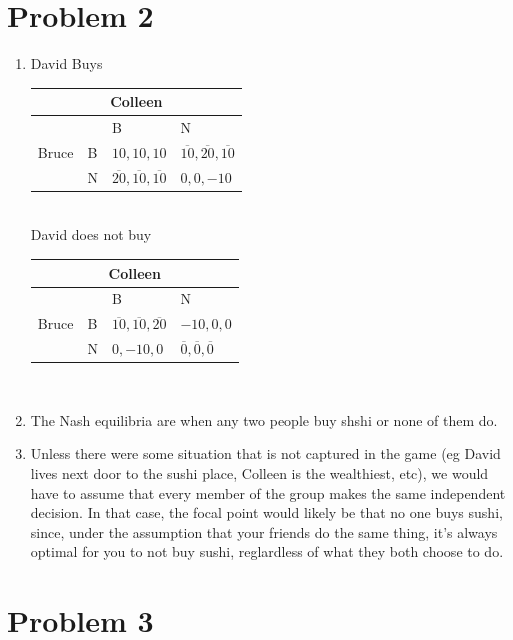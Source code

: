 \documentclass[letterpaper]{article}
\begin{document}
\section{Problem 2}
\begin{enumerate}
    \item 
David Buys \\
\begin{tabular}{|l|l|l|l|}
\multicolumn{4}{c}{Colleen}                      \\ \hline
\multirow{3}{*}{Bruce} &   & B        & N        \\ \hline
                       & B & $10,10,10$ & $\overline{10},\overline{20},\overline{10}$ \\ \hline
                       & N & $\overline{20},\overline{10},\overline{10}$ & $0,0,-10$ \\ \hline
\end{tabular} \\
David does not buy \\
\begin{tabular}{|l|l|l|l|}
\multicolumn{4}{c}{Colleen}                      \\ \hline
\multirow{3}{*}{Bruce} &   & B        & N        \\ \hline
                       & B & $\overline{10},\overline{10},\overline{20}$ & $-10,0,0$  \\ \hline
                       & N & $0,-10,0$ & $\overline{0},\overline{0},\overline{0}$ \\ \hline
\end{tabular}\\

\item The Nash equilibria are when any two people buy shshi or none of them do.  
\item Unless there were some situation that is not captured in the game (eg David lives next door to the sushi place, Colleen is the wealthiest, etc), we would have to assume that every member of the group makes the same independent decision. In that case, the focal point would likely be that no one buys sushi, since, under the assumption that your friends do the same thing, it's always optimal for you to not buy sushi, reglardless of what they both choose to do.
\end{enumerate}
\section{Problem 3}
\end{document}

